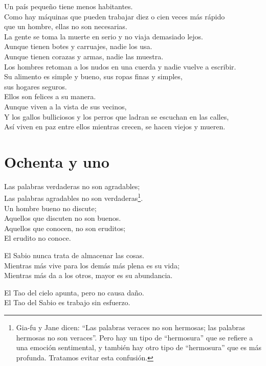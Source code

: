 \documentclass[book,b5paper,hidelinks,final]{memoir}
\begin{document}
	Un país pequeño tiene menos habitantes.\\
	Como hay máquinas que pueden trabajar diez o cien veces más rápido\\
	que un hombre, ellas no son necesarias.\\
	La gente se toma la muerte en serio y no viaja demasiado lejos.\\
	Aunque tienen botes y carruajes, nadie los usa.\\
	Aunque tienen corazas y armas, nadie las muestra.\\
	Los hombres retoman a los nudos en una cuerda y nadie vuelve a
	escribir.\\
	Su alimento es simple y bueno, sus ropas finas y simples,\\
	sus hogares seguros.\\
	Ellos son felices a su manera.\\
	Aunque viven a la vista de sus vecinos,\\
	Y los gallos bulliciosos y los perros que ladran se escuchan en las
	calles,\\
	Así viven en paz entre ellos mientras crecen, se hacen viejos y mueren.
	
	\chapter*{Ochenta y uno}
	
	Las palabras verdaderas no son agradables;\\
	Las palabras agradables no son verdaderas\footnote{Gia-fu y Jane dicen: ``Las palabras veraces no son hermosas; las
		palabras hermosas no son veraces''. Pero hay un tipo de ``hermosura''
		que se refiere a una emoción sentimental, y también hay otro tipo de
		``hermosura'' que es más profunda. Tratamos evitar esta confusión.}.\\
	Un hombre bueno no discute;\\
	Aquellos que discuten no son buenos.\\
	Aquellos que conocen, no son eruditos;\\
	El erudito no conoce.
	
	El Sabio nunca trata de almacenar las cosas.\\
	Mientras más vive para los demás más plena es su vida;\\
	Mientras más da a los otros, mayor es su abundancia.
	
	El Tao del cielo apunta, pero no causa daño.\\
	El Tao del Sabio es trabajo sin esfuerzo.
	
\end{document}
